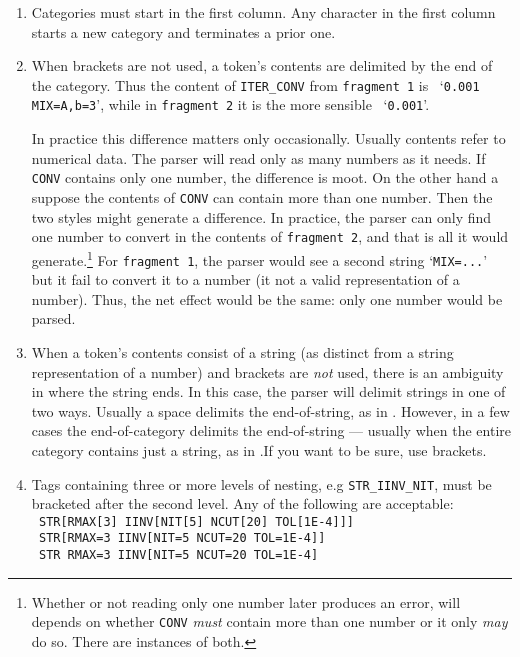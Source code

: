 \documentclass{article}
\begin{document}
\begin{enumerate}

\item Categories must start in the first column.  Any character in the
      first column starts a new category and terminates a prior one.

\item When brackets are not used, a token's contents are delimited by the
      end of the category.  Thus the content of {\tt{}ITER\_CONV} from
      {\tt{}fragment 1} is \ `{\tt{}0.001 MIX=A,b=3}', while in
      {\tt{}fragment 2} it is the more sensible \ `{\tt{}0.001}'.

      In practice this difference matters only occasionally.  Usually
      contents refer to numerical data. The parser will read only as many
      numbers as it needs.  If {\tt{}CONV} contains only one number, the
      difference is moot.  On the other hand a suppose the contents of
      {\tt{}CONV} can contain more than one number.  Then the two styles
      might generate a difference.  In practice, the parser can only find
      one number to convert in the contents of {\tt{}fragment 2}, and that
      is all it would generate.\footnote{Whether or not reading only one
      number later produces an error, will depends on whether {\tt{}CONV}
      \emph{must} contain more than one number or it only \emph{may} do
      so.  There are instances of both.}  For {\tt{}fragment 1}, the parser would see a second string
      `{\tt{}MIX=...}' but it fail to convert it to a number (it not a
      valid representation of a number). Thus, the net effect would be the
      same: only one number would be parsed.

\item When a token's contents consist of a string (as distinct from a
      string representation of a number) and brackets are \emph{not} used,
      there is an ambiguity in where the string ends.  In this case, the
      parser will delimit strings in one of two ways.  Usually a space
      delimits the end-of-string, as in .\quad
      However, in a few cases the end-of-category delimits the
      end-of-string --- usually when the entire category contains just a
      string, as in .\quad If
      you want to be sure, use brackets.

\item Tags containing three or more levels of nesting, e.g {\tt{}STR\_IINV\_NIT},
      must be bracketed after the second level.  Any of the following
      are acceptable:\\
      {\tt{} STR[RMAX[3] IINV[NIT[5] NCUT[20] TOL[1E-4]]]}\\
      {\tt{} STR[RMAX=3 IINV[NIT=5 NCUT=20 TOL=1E-4]]}\\
      {\tt{} STR RMAX=3 IINV[NIT=5 NCUT=20 TOL=1E-4]}


\end{enumerate}
\end{document}
